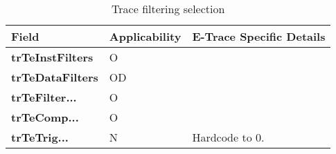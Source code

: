 \begin{table}[htp]
  \centering
  \caption{Trace filtering selection}
  \label{tab:ctl-filtersel}
  \begin{tabulary}{\textwidth}{|l|l|p{90mm}|}
    \hline
    {\bf Field} & {\bf Applicability} & {\bf E-Trace Specific Details} \\
    \hline
    \textbf{trTeInstFilters} & O & \\
    \hline
    \textbf{trTeDataFilters} & OD & \\
    \hline
    \textbf{trTeFilter...} & O & \\
    \hline
    \textbf{trTeComp...} & O & \\
    \hline
    \textbf{trTeTrig...} & N & Hardcode to 0.\\
    \hline
  \end{tabulary}
\end{table}
